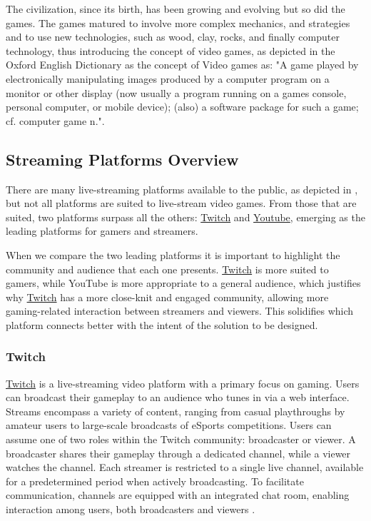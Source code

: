     The civilization, since its birth, has been growing and evolving but so did the games. The games matured to involve more complex mechanics, and strategies and to use new technologies, such as wood, clay, rocks, and finally computer technology, thus introducing the concept of video games, as depicted in the Oxford English Dictionary as the concept of Video games as: "A game played by electronically manipulating images produced by a computer program on a monitor or other display (now usually a program running on a games console, personal computer, or mobile device); (also) a software package for such a game; cf. computer game n."\cite{videogame_oed}.
    
\subsection{Streaming Platforms Overview}

    There are many live-streaming platforms available to the public, as depicted in \cite{EsportsLiveStreamingPlatforms}, but not all platforms are suited to live-stream video games. From those that are suited, two platforms surpass all the others: \href{https://www.twitch.tv/}{Twitch} and \href{https://www.youtube.com/}{Youtube}, emerging as the leading platforms for gamers and streamers.

    When we compare the two leading platforms \cite{TwitchVSYoutube} it is important to highlight the community and audience that each one presents. \href{https://www.twitch.tv/}{Twitch} is more suited to gamers, while YouTube is more appropriate to a general audience, which justifies why \href{https://www.twitch.tv/}{Twitch} has a more close-knit and engaged community, allowing more gaming-related interaction between streamers and viewers. This solidifies which platform connects better with the intent of the solution to be designed.

\subsubsection{Twitch}
    \href{https://www.twitch.tv/}{Twitch} is a live-streaming video platform with a primary focus on gaming. Users can broadcast their gameplay to an audience who tunes in via a web interface. Streams encompass a variety of content, ranging from casual playthroughs by amateur users to large-scale broadcasts of eSports competitions. Users can assume one of two roles within the Twitch community: broadcaster or viewer. A broadcaster shares their gameplay through a dedicated channel, while a viewer watches the channel. Each streamer is restricted to a single live channel, available for a predetermined period when actively broadcasting. To facilitate communication, channels are equipped with an integrated chat room, enabling interaction among users, both broadcasters and viewers \cite{Twitch_streaming_platform}.


